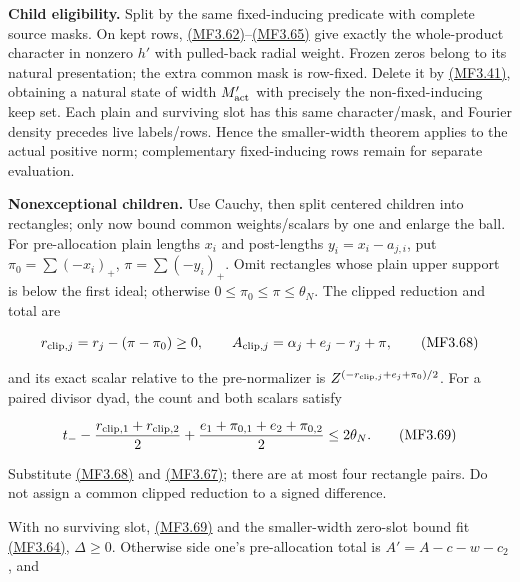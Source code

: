 \textbf{Child eligibility.} Split by the same fixed-inducing predicate with complete source masks. On kept rows, \protect\hyperlink{mf:eq:B3.62}{(MF3.62)}--\protect\hyperlink{mf:eq:B3.65}{(MF3.65)} give exactly the whole-product character in nonzero \(h'\) with pulled-back radial weight. Frozen zeros belong to its natural presentation; the extra common mask is row-fixed. Delete it by \protect\hyperlink{mf:eq:B3.41}{(MF3.41)}, obtaining a natural state of width \(M'_{\rm act}\) with precisely the non-fixed-inducing keep set. Each plain and surviving slot has this same character/mask, and Fourier density precedes live labels/rows. Hence the smaller-width theorem applies to the actual positive norm; complementary fixed-inducing rows remain for separate evaluation.

\textbf{Nonexceptional children.} Use Cauchy, then split centered children into rectangles; only now bound common weights/scalars by one and enlarge the ball. For pre-allocation plain lengths \(x_i\) and post-lengths \(y_i=x_i-a_{j,i}\), put \(\pi_0=\sum(-x_i)_+\), \(\pi=\sum(-y_i)_+\). Omit rectangles whose plain upper support is below the first ideal; otherwise \(0\le\pi_0\le\pi\le\theta_N\). The clipped reduction and total are

\hypertarget{mf:eq:B3.68}{}

\label{mf:eq:B3.68}

\[
r_{{\rm clip},j}=r_j-(\pi-\pi_0)\ge0,\qquad
A_{{\rm clip},j}=\alpha_j+e_j-r_j+\pi,
\qquad\text{(MF3.68)}
\]

and its exact scalar relative to the pre-normalizer is \(Z^{(-r_{{\rm clip},j}+e_j+\pi_0)/2}\). For a paired divisor dyad, the count and both scalars satisfy

\hypertarget{mf:eq:B3.69}{}

\label{mf:eq:B3.69}

\[
t_--\frac{r_{{\rm clip},1}+r_{{\rm clip},2}}2
 +\frac{e_1+\pi_{0,1}+e_2+\pi_{0,2}}2\le2\theta_N.
\qquad\text{(MF3.69)}
\]

Substitute \protect\hyperlink{mf:eq:B3.68}{(MF3.68)} and \protect\hyperlink{mf:eq:B3.67}{(MF3.67)}; there are at most four rectangle pairs. Do not assign a common clipped reduction to a signed difference.

With no surviving slot, \protect\hyperlink{mf:eq:B3.69}{(MF3.69)} and the smaller-width zero-slot bound fit \protect\hyperlink{mf:eq:B3.64}{(MF3.64)}, \(\Delta\ge0\). Otherwise side one's pre-allocation total is \(A'=A-c-w-c_2\), and

\hypertarget{mf:eq:B3.70}{}

